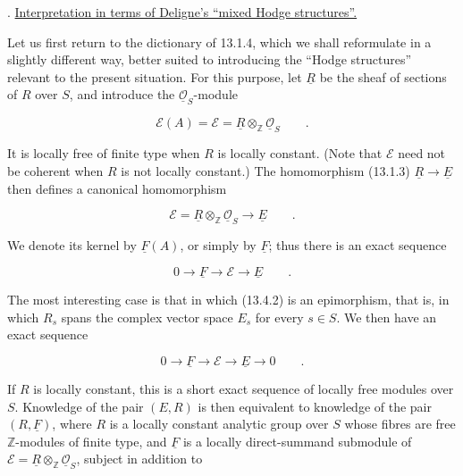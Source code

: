 \medskip
{}. \underline{Interpretation in terms of Deligne's ``mixed Hodge
structures''.}

Let us first return to the dictionary of 13.1.4, which we shall
reformulate in a slightly different way, better suited to introducing
the ``Hodge structures'' relevant to the present situation.  For this
purpose, let $\underline R$ be the sheaf of sections of $R$ over $S$, and
introduce the $\underline{\mathcal O}_S$-module

\begin{equation}\tag{13.4.1}
 \mathcal E(A)=\mathcal E=
 \underline R\otimes_{\mathbb Z}\underline{\mathcal O}_S\qquad .
\end{equation}

\noindent
It is locally free of finite type when $R$ is locally constant.  (Note
that $\mathcal E$ need not be coherent when $R$ is not locally
constant.)  The homomorphism (13.1.3)
$\underline R\longrightarrow\underline E$ then defines a canonical
homomorphism

\begin{equation}\tag{13.4.2}
 \mathcal E=\underline R\otimes_{\mathbb Z}
 \underline{\mathcal O}_S\longrightarrow\underline E\qquad .
\end{equation}

\noindent
We denote its kernel by $\underline F(A)$, or simply by $\underline F$;
thus there is an exact sequence

\begin{equation}\tag{13.4.3}
 0\longrightarrow\underline F\longrightarrow\mathcal E
 \longrightarrow\underline E\qquad .
\end{equation}

\noindent
The most interesting case is that in which (13.4.2) is an epimorphism,
that is, in which $R_s$ spans the complex vector space $E_s$ for every
$s\in S$.  We then have an exact sequence

\begin{equation}\tag{13.4.4}
 0\longrightarrow\underline F\longrightarrow\mathcal E
 \longrightarrow\underline E\longrightarrow0\qquad .
\end{equation}

\noindent
If $R$ is locally constant, this is a short exact sequence of locally
free modules over $S$.  Knowledge of the pair $(E,R)$ is then equivalent
to knowledge of the pair $(R,\underline F)$, where $R$ is a locally
constant analytic group over $S$ whose fibres are free $\mathbb Z$-modules
of finite type, and $\underline F$ is a locally direct-summand submodule
of $\mathcal E=\underline R\otimes_{\mathbb Z}
\underline{\mathcal O}_S$, subject in addition to

